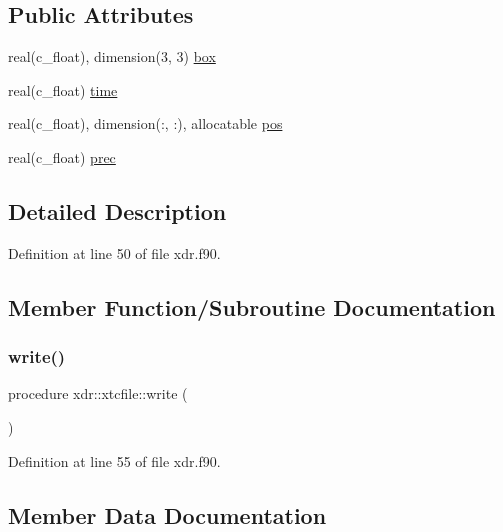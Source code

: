 \subsection*{Public Attributes}
\begin{DoxyCompactItemize}
\item 
real(c\+\_\+float), dimension(3, 3) \hyperlink{structxdr_1_1xtcfile_a7472d3a09f388bc3f95b74a289b994ad}{box}
\item 
real(c\+\_\+float) \hyperlink{structxdr_1_1xtcfile_a8bbfbd475a67d143c56584ec6adc5851}{time}
\item 
real(c\+\_\+float), dimension(\+:, \+:), allocatable \hyperlink{structxdr_1_1xtcfile_abda2627be95e0de9df18e915d53a988a}{pos}
\item 
real(c\+\_\+float) \hyperlink{structxdr_1_1xtcfile_aac421da0ff0c236f762eb81f1b726c2f}{prec}
\end{DoxyCompactItemize}


\subsection{Detailed Description}


Definition at line 50 of file xdr.\+f90.



\subsection{Member Function/\+Subroutine Documentation}
\mbox{\label{structxdr_1_1xtcfile_ac2af78519ced579714c7ffe4f15f5d46}} 
\subsubsection{\texorpdfstring{write()}{write()}}
{\footnotesize\ttfamily procedure xdr\+::xtcfile\+::write (\begin{DoxyParamCaption}{ }\end{DoxyParamCaption})}



Definition at line 55 of file xdr.\+f90.



\subsection{Member Data Documentation}
\mbox{\label{structxdr_1_1xtcfile_a7472d3a09f388bc3f95b74a289b994ad}} 
